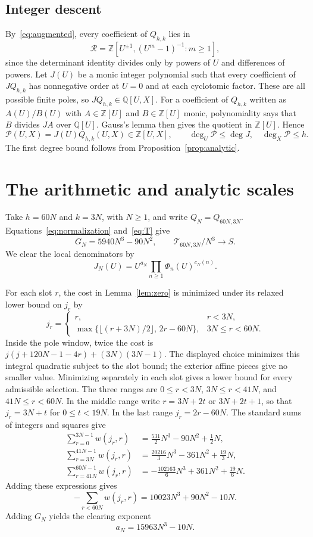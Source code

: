 \documentclass[12pt]{article}
\theoremstyle{remark}
\newcommand{\Q}{\mathbb Q}
\newcommand{\Z}{\mathbb Z}
\begin{document}
\subsection{Integer descent}

By~\eqref{eq:augmented}, every coefficient of $Q_{h,k}$ lies in
\[
\mathcal R=\Z[U^{\pm1},(U^m-1)^{-1}:m\geq1],
\]
since the determinant identity divides only by powers of $U$ and differences
of powers. Let $J(U)$ be a monic integer polynomial such that every
coefficient of $JQ_{h,k}$ has nonnegative order at $U=0$ and at each
cyclotomic factor. These are all possible finite poles, so $JQ_{h,k}\in\Q[U,X]$.
For a coefficient of $Q_{h,k}$ written as $A(U)/B(U)$ with $A\in\Z[U]$ and $B\in\Z[U]$
monic, polynomiality says that $B$ divides $JA$ over $\Q[U]$.
Gauss's lemma then gives the quotient in $\Z[U]$. Hence
\begin{equation}\label{eq:integerpoly}
\mathcal P(U,X)=J(U)Q_{h,k}(U,X)\in\Z[U,X],\qquad
\deg_U\mathcal P\leq\deg J,\quad\deg_X\mathcal P\leq h.
\end{equation}
The first degree bound follows from Proposition~\ref{prop:analytic}.

\section{The arithmetic and analytic scales}\label{sec:scales}

Take $h=60N$ and $k=3N$, with $N\geq1$, and write $Q_N=Q_{60N,3N}$.
Equations~\eqref{eq:normalization} and~\eqref{eq:T} give
\[
G_N=5940N^3-90N^2,\qquad \mathcal T_{60N,3N}/N^3\longrightarrow S.
\]
We clear the local denominators by
\[
J_N(U)=U^{a_N}\prod_{n\geq1}\Phi_n(U)^{c_N(n)}.
\]

For each slot $r$, the cost in Lemma~\ref{lem:zero} is minimized under its
relaxed lower bound on $j_r$ by
\[
j_r=\begin{cases}r,&r<3N,\\
\max\{\lfloor(r+3N)/2\rfloor,\,2r-60N\},&3N\leq r<60N.
\end{cases}
\]
Inside the pole window, twice the cost is
$j(j+120N-1-4r)+(3N)(3N-1)$.
The displayed choice minimizes this integral quadratic subject to the slot bound;
the exterior affine pieces give no smaller value. Minimizing separately in each
slot gives a lower bound for every admissible selection.
The three ranges are $0\leq r<3N$, $3N\leq r<41N$, and
$41N\leq r<60N$. In the middle range write $r=3N+2t$ or $3N+2t+1$,
so that $j_r=3N+t$ for $0\leq t<19N$. In the last range $j_r=2r-60N$.
The standard sums of integers and squares give
\begin{align*}
\sum_{r=0}^{3N-1}w(j_r,r)
 &=\frac{531}{2}N^3-90N^2+\frac12N,\\
\sum_{r=3N}^{41N-1}w(j_r,r)
 &=\frac{20216}{3}N^3-361N^2+\frac{19}{3}N,\\
\sum_{r=41N}^{60N-1}w(j_r,r)
 &=-\frac{102163}{6}N^3+361N^2+\frac{19}{6}N.
\end{align*}
Adding these expressions gives
\[
-\sum_{r<60N}w(j_r,r)=10023N^3+90N^2-10N.
\]
Adding $G_N$ yields the clearing exponent
\begin{equation}\label{eq:algzero}
a_N=15963N^3-10N.
\end{equation}
\end{document}
